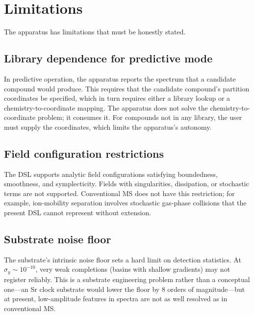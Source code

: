 \documentclass[twocolumn,11pt,a4paper]{article}
\theoremstyle{definition}
\theoremstyle{remark}
\begin{document}
\section{Limitations}
\label{sec:limitations}

The apparatus has limitations that must be honestly stated.

\subsection{Library dependence for predictive mode}

In predictive operation, the apparatus reports the spectrum that a candidate compound would produce. This requires that the candidate compound's partition coordinates be specified, which in turn requires either a library lookup or a chemistry-to-coordinate mapping. The apparatus does not solve the chemistry-to-coordinate problem; it consumes it. For compounds not in any library, the user must supply the coordinates, which limits the apparatus's autonomy.

\subsection{Field configuration restrictions}

The DSL supports analytic field configurations satisfying boundedness, smoothness, and symplecticity. Fields with singularities, dissipation, or stochastic terms are not supported. Conventional MS does not have this restriction; for example, ion-mobility separation involves stochastic gas-phase collisions that the present DSL cannot represent without extension.

\subsection{Substrate noise floor}

The substrate's intrinsic noise floor sets a hard limit on detection statistics. At $\sigma_y \sim 10^{-10}$, very weak completions (basins with shallow gradients) may not register reliably. This is a substrate engineering problem rather than a conceptual one---an Sr clock substrate would lower the floor by 8 orders of magnitude---but at present, low-amplitude features in spectra are not as well resolved as in conventional MS.
\end{document}
